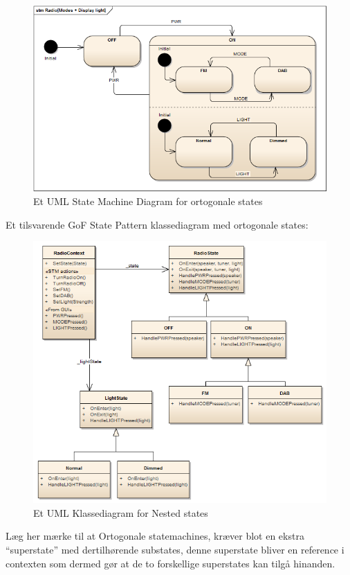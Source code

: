 \begin{figure}[H]
	\centering
	\includegraphics[width=0.7\linewidth]{figs/state/RadioModesDisplayLight}
	\caption{Et UML State Machine Diagram for ortogonale states}
	\label{fig:umlOrtogonalState}
\end{figure}

Et tilsvarende GoF State Pattern klassediagram med ortogonale states:

\begin{figure}[H]
	\centering
	\includegraphics[width=0.7\linewidth]{figs/state/RadioOrthogonal_SP}
	\caption{Et UML Klassediagram for Nested states}
	\label{fig:UMLClassOrtogonalState}
\end{figure}

Læg her mærke til at Ortogonale statemachines, kræver blot en ekstra “superstate” med dertilhørende substates, denne superstate bliver en reference i contexten som dermed gør at de to forskellige superstates kan tilgå hinanden.

